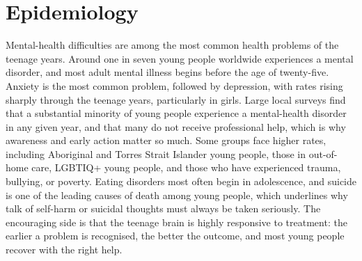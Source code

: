 \section*{Epidemiology}
Mental-health difficulties are among the most common health problems of the teenage years. Around one in seven young people worldwide experiences a mental disorder, and most adult mental illness begins before the age of twenty-five. Anxiety is the most common problem, followed by depression, with rates rising sharply through the teenage years, particularly in girls. Large local surveys find that a substantial minority of young people experience a mental-health disorder in any given year, and that many do not receive professional help, which is why awareness and early action matter so much. Some groups face higher rates, including Aboriginal and Torres Strait Islander young people, those in out-of-home care, LGBTIQ+ young people, and those who have experienced trauma, bullying, or poverty. Eating disorders most often begin in adolescence, and suicide is one of the leading causes of death among young people, which underlines why talk of self-harm or suicidal thoughts must always be taken seriously. The encouraging side is that the teenage brain is highly responsive to treatment: the earlier a problem is recognised, the better the outcome, and most young people recover with the right help.


